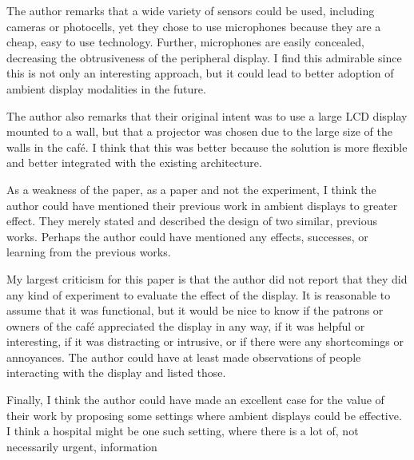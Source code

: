 \documentclass{article}
\begin{document}
The author remarks that a wide variety of sensors could be used, including cameras or photocells, yet they chose to use microphones because they are a cheap, easy to use technology. Further, microphones are easily concealed, decreasing the obtrusiveness of the peripheral display. I find this admirable since this is not only an interesting approach, but it could lead to better adoption of ambient display modalities in the future.

The author also remarks that their original intent was to use a large LCD display mounted to a wall, but that a projector was chosen due to the large size of the walls in the caf\'{e}. I think that this was better because the solution is more flexible and better integrated with the existing architecture.

As a weakness of the paper, as a paper and not the experiment, I think the author could have mentioned their previous work in ambient displays to greater effect. They merely stated and described the design of two similar, previous works. Perhaps the author could have mentioned any effects, successes, or learning from the previous works.

My largest criticism for this paper is that the author did not report that they did any kind of experiment to evaluate the effect of the display. It is reasonable to assume that it was functional, but it would be nice to know if the patrons or owners of the caf\'{e} appreciated the display in any way, if it was helpful or interesting, if it was distracting or intrusive, or if there were any shortcomings or annoyances. The author could have at least made observations of people interacting with the display and listed those.

Finally, I think the author could have made an excellent case for the value of their work by proposing some settings where ambient displays could be effective. I think a hospital might be one such setting, where there is a lot of, not necessarily urgent, information
\end{document}
